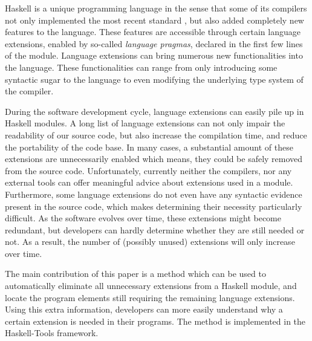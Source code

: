 \documentclass[main.tex]{subfiles}
\begin{document}
	
	Haskell is a unique programming language in the sense that some of its compilers not only implemented the most recent standard \cite{haskell2010-bib}, but also added completely new features to the language. These features are accessible through certain language extensions, enabled by so-called \emph{language pragmas}, declared in the first few lines of the module. Language extensions can bring numerous new functionalities into the language. These functionalities can range from only introducing some syntactic sugar to the language to even modifying the underlying type system of the compiler. 
	
	During the software development cycle, language extensions can easily pile up in Haskell modules. A long list of language extensions can not only impair the readability of our source code, but also increase the compilation time, and reduce the portability of the code base. In many cases, a substantial amount of these extensions are unnecessarily enabled which means, they could be safely removed from the source code. Unfortunately, currently neither the compilers, nor any external tools can offer meaningful advice about extensions used in a module. Furthermore, some language extensions do not even have any syntactic evidence present in the source code, which makes determining their necessity particularly difficult. As the software evolves over time, these extensions might become redundant, but developers can hardly determine whether they are still needed or not. As a result, the number of (possibly unused) extensions will only increase over time.
	
	The main contribution of this paper is a method which can be used to automatically eliminate all unnecessary extensions from a Haskell module, and locate the program elements still requiring the remaining language extensions. Using this extra information, developers can more easily understand why a certain extension is needed in their programs. The method is implemented in the Haskell-Tools framework.
	
\end{document}
